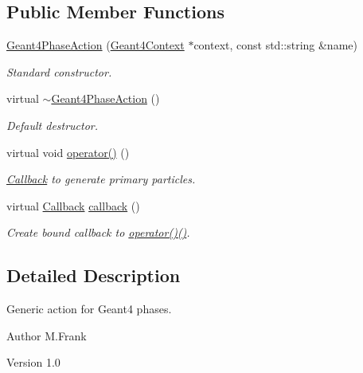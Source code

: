 \subsection*{Public Member Functions}
\begin{DoxyCompactItemize}
\item 
\hyperlink{class_d_d4hep_1_1_simulation_1_1_geant4_phase_action_ad15d56cd51ec30099dea4db3ab92ae52}{Geant4PhaseAction} (\hyperlink{class_d_d4hep_1_1_simulation_1_1_geant4_context}{Geant4Context} $\ast$context, const std::string \&name)
\begin{DoxyCompactList}\small\item\em Standard constructor. \item\end{DoxyCompactList}\item 
virtual \hyperlink{class_d_d4hep_1_1_simulation_1_1_geant4_phase_action_aba4b3737a47e5f9aa71ee76c1292bfdd}{$\sim$Geant4PhaseAction} ()
\begin{DoxyCompactList}\small\item\em Default destructor. \item\end{DoxyCompactList}\item 
virtual void \hyperlink{class_d_d4hep_1_1_simulation_1_1_geant4_phase_action_a5d8bac662ec707a8cdff0bd3cdd9b831}{operator()} ()
\begin{DoxyCompactList}\small\item\em \hyperlink{class_d_d4hep_1_1_callback}{Callback} to generate primary particles. \item\end{DoxyCompactList}\item 
virtual \hyperlink{class_d_d4hep_1_1_callback}{Callback} \hyperlink{class_d_d4hep_1_1_simulation_1_1_geant4_phase_action_a2ec5c793439611a45e83c2fffd5093d2}{callback} ()
\begin{DoxyCompactList}\small\item\em Create bound callback to \hyperlink{class_d_d4hep_1_1_simulation_1_1_geant4_phase_action_a5d8bac662ec707a8cdff0bd3cdd9b831}{operator()()}. \item\end{DoxyCompactList}\end{DoxyCompactItemize}


\subsection{Detailed Description}
Generic action for Geant4 phases. \begin{DoxyAuthor}{Author}
M.Frank 
\end{DoxyAuthor}
\begin{DoxyVersion}{Version}
1.0 
\end{DoxyVersion}


